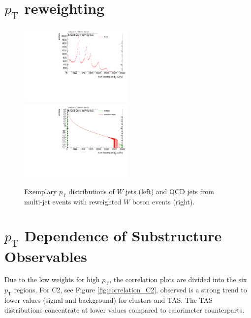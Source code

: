 
\section{$p_{\text{T}}$ reweighting}
\begin{figure} 
	\includegraphics[width=0.5\textwidth]{sascha_input/plots/track_selection/h_leadpt_truth.pdf} \hspace{1mm}
	\includegraphics[width=0.5\textwidth]{sascha_input/plots/track_selection/h_leadpt_truth_weight.pdf}
\caption{\footnotesize{Exemplary $p_{\mathrm{T}}$ distributions of $W$ jets (left) and QCD jets from multi-jet events with reweighted $W$ boson events (right).}}\label{fig:p_T}
\end{figure}

\section{$p_{\text{T}}$ Dependence of Substructure Observables}\label{appendix:pt_dependence}
Due to the low weights for high $p_{\mathrm{T}}$, the correlation plots are divided into the six $p_{\mathrm{T}}$ regions. For C2, see Figure \ref{fig:correlation_C2}, observed is a strong trend to lower values (signal and background) for clusters and TAS. The TAS distributions concentrate at lower values compared to calorimeter counterparts.

